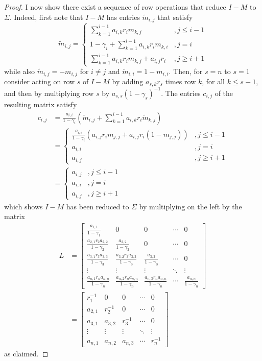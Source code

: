 \documentclass[]{interact}
\theoremstyle{plain}%
\theoremstyle{definition}
\theoremstyle{remark}
\begin{document}
\begin{proof}
I now show there exist a sequence of row operations that reduce $I-M$ to $\Sigma$. Indeed, first note that $I-M$ has entries $\tilde{m}_{i,j}$ that satisfy
\[
\tilde{m}_{i,j}=\begin{cases}
\sum_{k=1}^{i-1}a_{i,k}r_im_{k,j} & , j\leq i-1 \\
1-\gamma_i +\sum_{k=1}^{i-1}a_{i,k}r_im_{k,i} &, j=i\\
\sum_{k=1}^{i-1}a_{i,k}r_im_{k,j} + a_{i,j}r_i  &, j\geq i+1
\end{cases}
\]
while also $\tilde{m}_{i,j}=-m_{i,j}$ for $i\neq j$ and $\tilde{m}_{i,i}=1-m_{i,i}$.
Then, for $s=n$ to $s=1$ consider acting on row $s$ of $I-M$ by adding $a_{s,k}r_s$ times row $k$, for all $k\leq s-1$, and then by multiplying row $s$ by $a_{s,s}(1-\gamma_{s})^{-1}$. The entries $c_{i,j}$ of the resulting matrix satisfy
\begin{align*}
c_{i,j}&=\frac{a_{i,i}}{1-\gamma_i}\left( \tilde{m}_{i,j}+\sum_{k=1}^{i-1}a_{i,k}r_i\tilde{m}_{k,j}\right) \\
&=\begin{cases}
\frac{a_{i,i}}{1-\gamma_i}\left( a_{i,j}r_im_{j,j}+a_{i,j}r_i(1-m_{j,j})\right) &, j\leq i-1\\
a_{i,i} &, j=i\\
a_{i,j} &, j\geq i+1
\end{cases} \\
&=
\begin{cases}
a_{i,j}&, j\leq i-1\\
a_{i,i} &, j=i\\
a_{i,j} &, j\geq i+1
\end{cases}
\end{align*}
which shows $I-M$ has been reduced to $\Sigma$ by multiplying on the left by the matrix
\begin{align*}
L&=\begin{bmatrix}
\frac{a_{1,1}}{1-\gamma_1} & 0 & 0 & \cdots & 0\\
\frac{a_{2,1}r_2a_{2,2}}{1-\gamma_2}&  \frac{a_{2,2}}{1-\gamma_2}& 0 & \cdots & 0\\
\frac{a_{3,1}r_3a_{3,3}}{1-\gamma_3}& \frac{a_{3,2}r_3a_{3,3}}{1-\gamma_3} & \frac{a_{3,3}}{1-\gamma_3}& \cdots & 0\\
\vdots & \vdots & \vdots & \ddots & \vdots\\
\frac{a_{n,1}r_na_{n,n}}{1-\gamma_n}& \frac{a_{n,2}r_na_{n,n}}{1-\gamma_n} & \frac{a_{n,3}r_na_{n,n}}{1-\gamma_n} & \cdots & \frac{a_{n,n}}{1-\gamma_n}
\end{bmatrix}\\
&=\begin{bmatrix}
r_1^{-1} & 0 & 0 & \cdots & 0\\
a_{2,1}&  r_2^{-1}& 0 & \cdots & 0\\
a_{3,1}& a_{3,2} & r_3^{-1}& \cdots & 0\\
\vdots & \vdots & \vdots & \ddots & \vdots\\
a_{n,1}& a_{n,2} & a_{n,3} & \cdots & r_n^{-1}
\end{bmatrix}
\end{align*}
as claimed. 
\end{proof}
\end{document}
